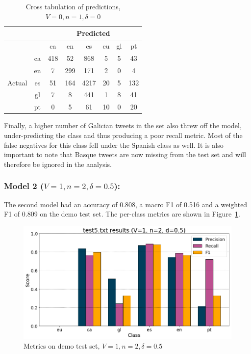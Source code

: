 \documentclass[runningheads]{llncs}
\begin{document}
\begin{table}
	\centering
	\caption{Cross tabulation of predictions, $V=0, n=1, \delta=0$}
	\label{tab:demo_confusion_0_1_0}
	\begin{tabular}{|c|c|c|c|c|c|c|c|} \hline
        & & \multicolumn{6}{c|}{Predicted} \\ \hline
		& &    ca &   en &    es &  eu &   gl &   pt \\ \hline
		\multirow{6}{*}{Actual} & ca   &  418 &   52 &   868 &   5 &   5 &   43 \\
		& en   &    7 &  299 &   171 &   2 &   0 &    4 \\
		& es   &   51 &  164 &  4217 &  20 &   5 &  132 \\
		& gl   &    7 &    8 &   441 &   1 &   8 &   41 \\
		& pt   &    0 &    5 &    61 &  10 &   0 &   20 \\ \hline
		\end{tabular}
\end{table}

Finally, a higher number of Galician tweets in the set also threw off the model, under-predicting the class and thus producing a poor recall metric. Most of the false negatives for this class fell under the Spanish class as well. It is also important to note that Basque tweets are now missing from the test set and will therefore be ignored in the analysis.

\subsubsection{Model 2 ($V=1, n=2, \delta=0.5$): }
The second model had an accuracy of 0.808, a macro F1 of 0.516 and a weighted F1 of 0.809 on the demo test set. The per-class metrics are shown in Figure~\ref{fig:demo_1_2_0.5}.

\begin{figure}
    \begin{center}
        \includegraphics[width=12.5cm]{images/test5_results_1_2_0.5.png}
        \caption{Metrics on demo test set, $V=1, n=2, \delta=0.5$}
        \label{fig:demo_1_2_0.5}
    \end{center}
\end{figure}
\end{document}
